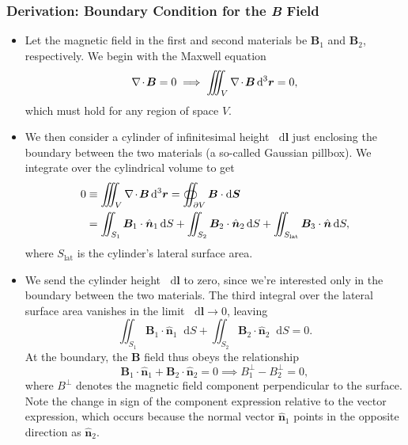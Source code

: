 \documentclass[11pt, a4paper]{article}
\newcommand{\diff}{\mathop{}\!\mathrm{d}} %
\newcommand{\dr}{\diff^{3} \r}  %
\renewcommand{\vec}[1]{\bm{#1}} %
\newcommand{\uvec}[1]{\hat{\vec{#1}}} %
\renewcommand{\r}{\vec{r}}
\newcommand{\B}{\vec{B}} %
\renewcommand{\div}{\nabla \mspace{-2mu} \cdot \mspace{-2mu}}
\begin{document}
\subsubsection{Derivation: Boundary Condition for the \textit{B} Field}
\begin{itemize}
	\item Let the magnetic field in the first and second materials be $ \B_{1} $ and $ \B_{2} $, respectively. We begin with the Maxwell equation
	\begin{equation*}
        \div \B = 0 \implies \iiint_{V} \div \B \dr = 0,
	\end{equation*}
	which must hold for any region of space $ V $. 
	
	
    \item We then consider a cylinder of infinitesimal height $ \diff \vec{l} $ just enclosing the boundary between the two materials (a so-called Gaussian pillbox). We integrate over the cylindrical volume to get
	\begin{align*}
        0 & \equiv \iiint_{V} \div \B \dr = \oiint_{\partial V} \B \cdot \diff \vec{S}  \\
        & = \iint_{S_{1}}\B_{1}\cdot \uvec{n}_{1}\diff S + \iint_{S_{2}}\B_{2}\cdot \uvec{n}_{2}\diff S + \iint_{S_{\text{lat}}}\B_{3}\cdot \uvec{n}\diff S,
	\end{align*}
	where $ S_{\text{lat}} $ is the cylinder's lateral surface area. 

    \item We send the cylinder height $ \diff \vec{l} $ to zero, since we're interested only in the boundary between the two materials. The third integral over the lateral surface area vanishes in the limit $ \diff \vec{l} \to 0 $, leaving
	\begin{equation*}
		\iint_{S_{1}}\B_{1}\cdot \uvec{n}_{1}\diff S + \iint_{S_{2}}\B_{2}\cdot \uvec{n}_{2}\diff S = 0.
	\end{equation*}
    At the boundary, the $ \B $ field thus obeys the relationship
	\begin{equation*}
        \B_{1} \cdot \uvec{n}_{1} + \B_{2} \cdot \uvec{n}_{2} = 0 \implies B_{1}^{\perp} - B_{2}^{\perp} = 0,
	\end{equation*}
    where $ B^{\perp} $ denotes the magnetic field component perpendicular to the surface. Note the change in sign of the component expression relative to the vector expression, which occurs because the normal vector $ \uvec{n}_{1} $ points in the opposite direction as $ \uvec{n}_{2} $.
	
	
\end{itemize}
\end{document}
